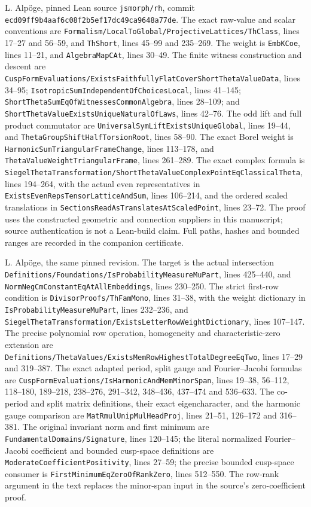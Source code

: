 L. Alp\"oge, pinned Lean source \texttt{jsmorph/rh}, commit
\texttt{ecd09ff9b4aaf6c08f2b5ef17dc49ca9648a77de}.
The exact raw-value and scalar conventions are
\texttt{Formalism/LocalToGlobal/ProjectiveLattices/ThClass},
lines 17--27 and 56--59, and \texttt{ThShort}, lines 45--99 and
235--269.  The weight is \texttt{EmbKCoe}, lines 11--21, and
\texttt{AlgebraMapCAt}, lines 30--49.
The finite witness construction and descent are
\texttt{CuspFormEvaluations/ExistsFaithfullyFlatCoverShortThetaValueData},
lines 34--95; \texttt{IsotropicSumIndependentOfChoicesLocal},
lines 41--145; \texttt{ShortThetaSumEqOfWitnessesCommonAlgebra},
lines 28--109; and
\texttt{ShortThetaValueExistsUniqueNaturalOfLaws}, lines 42--76.
The odd lift and full product commutator are
\texttt{UniversalSymLiftExistsUniqueGlobal}, lines 19--44, and
\texttt{ThetaGroupShiftHalfTorsionRoot}, lines 58--90.
The exact Borel weight is
\texttt{HarmonicSumTriangularFrameChange}, lines 113--178, and
\texttt{ThetaValueWeightTriangularFrame}, lines 261--289.
The exact complex formula is
\texttt{SiegelThetaTransformation/ShortThetaValueComplexPointEqClassicalTheta},
lines 194--264, with the actual even representatives in
\texttt{ExistsEvenRepsTensorLatticeAndSum}, lines 106--214, and
the ordered scaled translations in
\texttt{SectionsReadAsTranslatesAtScaledPoint}, lines 23--72.
The proof uses the constructed geometric and
connection suppliers in this manuscript; source authentication is
not a Lean-build claim.  Full paths, hashes and bounded ranges are
recorded in the companion certificate.

L. Alp\"oge, the same pinned revision.
The target is the actual intersection
\texttt{Definitions/Foundations/IsProbabilityMeasureMuPart},
lines 425--440, and \texttt{NormNegCmConstantEqAtAllEmbeddings},
lines 230--250.  The strict first-row condition is
\texttt{DivisorProofs/ThFamMono}, lines 31--38, with the weight
dictionary in \texttt{IsProbabilityMeasureMuPart}, lines 232--236,
and \texttt{SiegelThetaTransformation/ExistsLetterRowWeightDictionary},
lines 107--147.  The precise polynomial row operation, homogeneity
and characteristic-zero extension are
\texttt{Definitions/ThetaValues/ExistsMemRowHighestTotalDegreeEqTwo},
lines 17--29 and 319--387.
The exact adapted period, split gauge and Fourier--Jacobi formulas are
\texttt{CuspFormEvaluations/IsHarmonicAndMemMinorSpan},
lines 19--38, 56--112, 118--180, 189--218, 238--276,
291--342, 348--436, 437--474 and 536--633.
The co-period and split matrix definitions, their exact eigencharacter,
and the harmonic gauge comparison are
\texttt{MatRmulUnipMulHeadProj}, lines 21--51, 126--172 and 316--381.
The original invariant norm and first minimum are
\texttt{FundamentalDomains/Signature}, lines 120--145;
the literal normalized Fourier--Jacobi coefficient and bounded
cusp-space definitions are \texttt{ModerateCoefficientPositivity},
lines 27--59;
the precise bounded cusp-space consumer is
\texttt{FirstMinimumEqZeroOfRankZero}, lines 512--550.
The row-rank argument in the text replaces the minor-span input in
the source's zero-coefficient proof.

